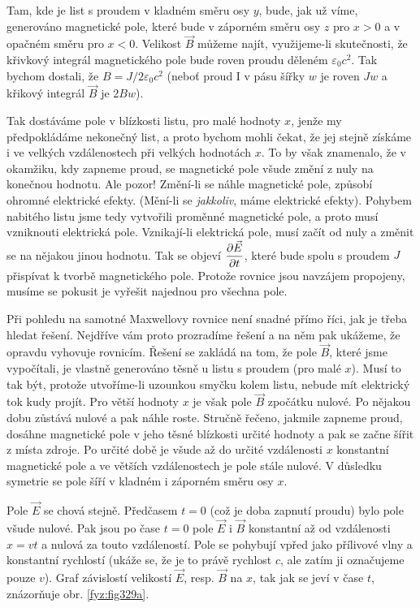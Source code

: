 {  Tam, kde je list s proudem v kladném směru osy \(y\), bude, jak už víme, generováno magnetické 
  pole, které bude v záporném směru osy \(z\) pro \(x>0\) a v opačném směru pro \(x<0\). Velikost 
  \(\vec{B}\) můžeme najít, využijeme-li skutečnosti, že křivkový integrál magnetického pole bude 
  roven proudu děleném \(\varepsilon_0c^2\). Tak bychom dostali, že \(B=J/2\varepsilon_0c^2\) 
  (neboť proud I v pásu šířky \(w\) je roven \(Jw\) a křikový integrál \(\vec{B}\) je \(2Bw\)).
  
  Tak dostáváme pole v blízkosti listu, pro malé hodnoty \(x\), jenže my předpokládáme nekonečný 
  list, a proto bychom mohli čekat, že jej stejně získáme i ve velkých vzdálenostech při velkých 
  hodnotách \(x\). To by však znamenalo, že v okamžiku, kdy zapneme proud, se magnetické pole všude 
  změní z nuly na konečnou hodnotu. Ale pozor! Změní-li se náhle magnetické pole, způsobí ohromné 
  elektrické efekty. (Mění-li se \emph{jakkoliv}, máme elektrické efekty). Pohybem nabitého listu 
  jsme tedy vytvořili proměnné magnetické pole, a proto musí vzniknouti elektrická pole. 
  Vznikají-li elektrická pole, musí začít od nuly a změnit se na nějakou jinou hodnotu. Tak se 
  objeví \(\dfrac{\partial \vec{E}}{\partial t}\), které bude spolu s proudem \(J\) přispívat k tvorbě magnetického 
  pole. Protože rovnice jsou navzájem propojeny, musíme se pokusit je vyřešit najednou pro všechna 
  pole.
  
  Při pohledu na samotné Maxwellovy rovnice není snadné přímo říci, jak je třeba hledat řešení. 
  Nejdříve vám proto prozradíme řešení a na něm pak ukážeme, že opravdu vyhovuje rovnicím. Řešení 
  se zakládá na tom, že pole \(\vec{B}\), které jsme vypočítali, je vlastně generováno těsně u 
  listu s proudem (pro malé \(x\)). Musí to tak být, protože utvoříme-li uzounkou smyčku kolem 
  listu, nebude mít elektrický tok kudy projít. Pro větší hodnoty \(x\) je však pole \(\vec{B}\) 
  zpočátku nulové. Po nějakou dobu zůstává nulové a pak náhle roste. Stručně řečeno, jakmile 
  zapneme proud, dosáhne magnetické pole v jeho těsné blízkosti určité hodnoty a pak se začne šířit 
  z místa zdroje. Po určité době je všude až do určité vzdálenosti \(x\) konstantní magnetické pole 
  a ve větších vzdálenostech je pole stále nulové. V důsledku symetrie se pole šíří v kladném i 
  záporném směru osy \(x\).
 
  Pole \(\vec{E}\) se chová stejně. Předčasem \(t = 0\) (což je doba zapnutí proudu) bylo pole 
  všude nulové. Pak jsou po čase \(t=0\) pole \(\vec{E}\) i \(\vec{B}\) konstantní až od 
  vzdálenosti \(x = vt\) a nulová za touto vzdáleností. Pole se pohybují vpřed jako přílivové vlny 
  a konstantní rychlostí (ukáže se, že je to právě rychlost \(c\), ale zatím ji označujeme pouze 
  \(v\)). Graf závislostí velikostí \(\vec{E}\), resp. \(\vec{B}\) na \(x\), tak jak se jeví v 
  čase \(t\), znázorňuje obr. \ref{fyz:fig329a}.
  
}
